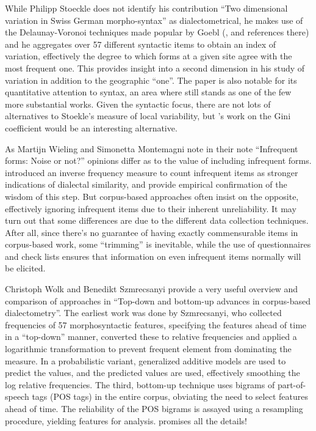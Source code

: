 \documentclass[output=paper]{LSP/langsci}
\begin{document}
While Philipp Stoeckle does not identify his contribution “Two dimensional variation in Swiss German morpho-syntax” as dialectometrical, he makes use of the Delaunay-Voronoi techniques made popular by Goebl (\citeyear{goebl_recent_2006}, and references there) and he aggregates over 57 different syntactic items to obtain an index of variation, effectively the degree to which forms at a given site agree with the most frequent one.  This provides insight into a second dimension in his study of variation in addition to the geographic “one”. The paper is also notable for its quantitative attention to syntax, an area where \citet{spruit_quantitative_2008} still stands as one of the few more substantial works. Given the syntactic focus, there are not lots of alternatives to Stoekle’s measure of local variability, but \citeauthor{kretzschmar_scaled_2013}'s work \citeyearpar{kretzschmar_scaled_2013} on the Gini coefficient would be an interesting alternative. 

As Martijn Wieling and Simonetta Montemagni note in their note “Infrequent forms: Noise or not?” opinions differ as to the value of including infrequent forms. \citet{goebl_dialektometrische_1984} introduced an inverse frequency measure to count infrequent items as stronger indications of dialectal similarity, and \citet{nerbonne_toward_2007} provide empirical confirmation of the wisdom of this step. But corpus-based approaches often insist on the opposite, effectively ignoring infrequent items due to their inherent unreliability. It may turn out that some differences are due to the different data collection techniques. After all, since there’s no guarantee of having exactly commensurable items in corpus-based work, some “trimming” is inevitable, while the use of questionnaires and check lists ensures that information on even infrequent items normally will be elicited.

Christoph Wolk and Benedikt Szmrecsanyi provide a very useful overview and comparison of approaches in “Top-down and bottom-up advances in corpus-based dialectometry”. The earliest work was done by Szmrecsanyi, who collected frequencies of 57 morphosyntactic features, specifying the features ahead of time in a “top-down” manner, converted these to relative frequencies and applied a logarithmic transformation to prevent frequent element from dominating the measure. In a probabilistic variant, generalized additive models are used to predict the values, and the predicted values are used, effectively smoothing the log relative frequencies. The third, bottom-up technique uses bigrams of part-of-speech tags (POS tags) in the entire corpus, obviating the need to select features ahead of time. The reliability of the POS bigrams is assayed using a resampling procedure, yielding features for analysis. \citet{wolk_integrating_2014} promises all the details!
\end{document}

